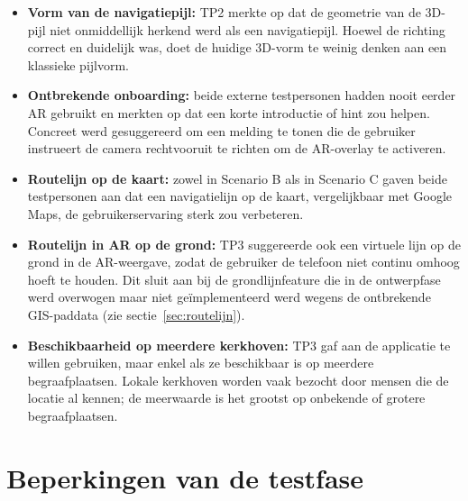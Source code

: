 \begin{itemize}
    \item \textbf{Vorm van de navigatiepijl:} TP2 merkte op dat de geometrie
    van de 3D-pijl niet onmiddellijk herkend werd als een navigatiepijl. Hoewel
    de richting correct en duidelijk was, doet de huidige 3D-vorm te weinig
    denken aan een klassieke pijlvorm.
    
    \item \textbf{Ontbrekende onboarding:} beide externe testpersonen hadden
    nooit eerder AR gebruikt en merkten op dat een korte introductie of hint
    zou helpen. Concreet werd gesuggereerd om een melding te tonen die de
    gebruiker instrueert de camera rechtvooruit te richten om de AR-overlay
    te activeren.
    
    \item \textbf{Routelijn op de kaart:} zowel in Scenario B als in Scenario C
    gaven beide testpersonen aan dat een navigatielijn op de kaart, vergelijkbaar
    met Google Maps, de gebruikerservaring sterk zou verbeteren.
    
    \item \textbf{Routelijn in AR op de grond:} TP3 suggereerde ook een
    virtuele lijn op de grond in de AR-weergave, zodat de gebruiker de telefoon
    niet continu omhoog hoeft te houden. Dit sluit aan bij de grondlijnfeature
    die in de ontwerpfase werd overwogen maar niet geïmplementeerd werd wegens
    de ontbrekende GIS-paddata (zie sectie~\ref{sec:routelijn}).
    
    \item \textbf{Beschikbaarheid op meerdere kerkhoven:} TP3 gaf aan de
    applicatie te willen gebruiken, maar enkel als ze beschikbaar is op meerdere
    begraafplaatsen. Lokale kerkhoven worden vaak bezocht door mensen die de
    locatie al kennen; de meerwaarde is het grootst op onbekende of grotere
    begraafplaatsen.
\end{itemize}

\section{Beperkingen van de testfase}
\label{sec:testbeperkingen}

